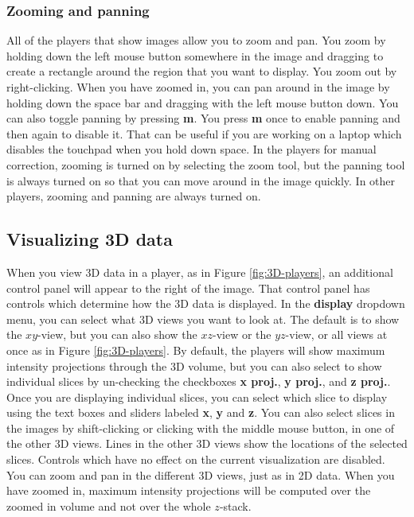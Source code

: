 \documentclass[a4paper, oneside, onecolumn, 11pt]{article}
\newcommand{\command}[1]{\textbf{#1}}
\newcommand{\control}[1]{\textbf{#1}}
\begin{document}
\subsubsection{Zooming and panning}
All of the players that show images allow you to zoom and pan. You zoom by holding down the left mouse button somewhere in the image and dragging to create a rectangle around the region that you want to display. You zoom out by right-clicking. When you have zoomed in, you can pan around in the image by holding down the space bar and dragging with the left mouse button down. You can also toggle panning by pressing \command{m}. You press \command{m} once to enable panning and then again to disable it. That can be useful if you are working on a laptop which disables the touchpad when you hold down space. In the players for manual correction, zooming is turned on by selecting the zoom tool, but the panning tool is always turned on so that you can move around in the image quickly. In other players, zooming and panning are always turned on.

\subsection{Visualizing 3D data}
When you view 3D data in a player, as in Figure \ref{fig:3D-players}, an additional control panel will appear to the right of the image. That control panel has controls which determine how the 3D data is displayed. In the \control{display} dropdown menu, you can select what 3D views you want to look at. The default is to show the $xy$-view, but you can also show the $xz$-view or the $yz$-view, or all views at once as in Figure \ref{fig:3D-players}. By default, the players will show maximum intensity projections through the 3D volume, but you can also select to show individual slices by un-checking the checkboxes \control{x proj.}, \control{y proj.}, and \control{z proj.}. Once you are displaying individual slices, you can select which slice to display using the text boxes and sliders labeled \control{x}, \control{y} and \control{z}. You can also select slices in the images by shift-clicking or clicking with the middle mouse button, in one of the other 3D views. Lines in the other 3D views show the locations of the selected slices. Controls which have no effect on the current visualization are disabled. You can zoom and pan in the different 3D views, just as in 2D data. When you have zoomed in, maximum intensity projections will be computed over the zoomed in volume and not over the whole $z$-stack.
\end{document}
